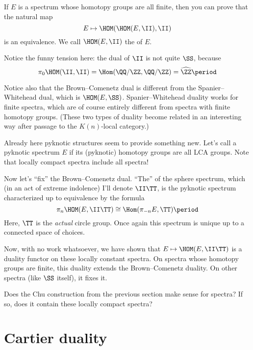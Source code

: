 \documentclass[leqno]{article}
\begin{document}
If \(E\) is a spectrum whose homotopy groups are all finite,
then you can prove that the natural map
\begin{equation*}
    E \mapsto \HOM(\HOM(E, \II), \II)
\end{equation*}
is an equivalence.
We call \(\HOM(E,\II)\) the  of \(E\).

Notice the funny tension here:
the dual of \(\II\) is not quite \(\SS\), because
\begin{equation*}
    \pi_{0}\HOM(\II,\II) = \Hom(\QQ/\ZZ, \QQ/\ZZ)
    = \widehat{\ZZ} \period
\end{equation*}

Notice also that the Brown--Comenetz dual is different
from the Spanier--Whitehead dual,
which is \(\HOM(E,\SS)\).
Spanier--Whitehead duality works for finite spectra,
which are of course entirely different from spectra
with finite homotopy groups.
(These two types of duality become related in an interesting way
after passage to the \(K(n)\)-local category.)

Already here pyknotic structures seem to provide something new.
Let's call a pyknotic spectrum \(E\) 
if its (pyknotic) homotopy groups are all LCA groups.
Note that locally compact spectra include all spectra!

Now let's \enquote{fix} the Brown--Comenetz dual.
\enquote{The}  of the sphere spectrum, which
(in an act of extreme indolence)
I'll denote \(\II\TT\),
is the pyknotic spectrum
characterized up to equivalence by the formula
\begin{equation*}
    \pi_n \HOM(E, \II\TT) \cong \Hom(\pi_{-n} E, \TT) \period
\end{equation*}
Here, \(\TT\) is the \emph{actual} circle group.
Once again this spectrum is unique up to a connected
space of choices.

Now, with no work whatsoever,
we have shown that \(E \mapsto \HOM(E, \II\TT)\) is a
duality functor on these locally constant spectra.
On spectra whose homotopy groups are finite,
this duality extends the Brown--Comenetz duality.
On other spectra (like \(\SS\) itself), it fixes it.

\begin{qst}
    Does the Chu construction from the previous section
    make sense for spectra?
    If so, does it contain these locally compact spectra?
\end{qst}

\section{Cartier duality}%
\label{cartier}
\end{document}
